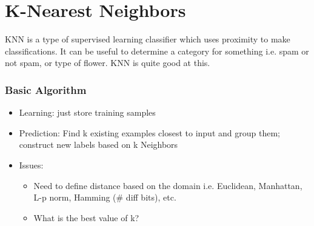 \chapter{K-Nearest Neighbors}
 KNN is a type of supervised learning classifier which uses proximity to make classifications. It can be useful to determine a category for something i.e. spam or not spam, or type of flower. KNN is quite good at this.

 \subsection*{Basic Algorithm}
\begin{itemize}
    \item Learning: just store training samples
    \item Prediction: Find k existing examples closest to input and group them; construct new labels based on k Neighbors
    \item Issues:
    \begin{itemize}
        \item Need to define distance based on the domain i.e. Euclidean, Manhattan, L-p norm, Hamming (\# diff bits), etc.
        \item What is the best value of k?
    \end{itemize}
\end{itemize}

